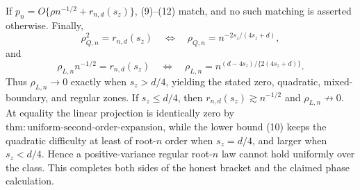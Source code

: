 If \(p_n=O\{\rho n^{-1/2}+r_{n,d}(s_z)\}\), (9)--(12) match, and no such matching is asserted otherwise.  Finally,
\[
 \rho_{Q,n}^2=r_{n,d}(s_z)
 \quad\Longleftrightarrow\quad
 \rho_{Q,n}=n^{-2s_z/(4s_z+d)},
\]
and
\[
 \rho_{L,n}n^{-1/2}=r_{n,d}(s_z)
 \quad\Longleftrightarrow\quad
 \rho_{L,n}=n^{(d-4s_z)/\{2(4s_z+d)\}}.
\]
Thus \(\rho_{L,n}\to0\) exactly when \(s_z>d/4\), yielding the stated zero, quadratic, mixed-boundary, and regular zones.  If \(s_z\le d/4\), then \(r_{n,d}(s_z)\gtrsim n^{-1/2}\) and \(\rho_{L,n}\not\to0\).  At equality the linear projection is identically zero by \(\mathrm{thm{:}uniform\text{-}second\text{-}order\text{-}expansion}\), while the lower bound (10) keeps the quadratic difficulty at least of root-\(n\) order when \(s_z=d/4\), and larger when \(s_z<d/4\).  Hence a positive-variance regular root-\(n\) law cannot hold uniformly over the class.  This completes both sides of the honest bracket and the claimed phase calculation.